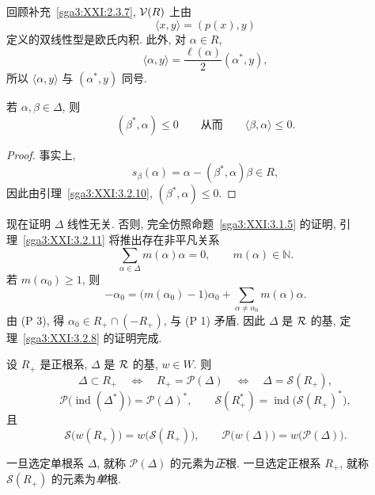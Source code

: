 回顾补充~\ref{sga3:XXI:2.3.7}, \(\mathcal{V}(R)\) 上由
\[
 \langle x,y\rangle=(p(x),y)
\]
定义的双线性型是欧氏内积. 此外, 对 \(\alpha\in R\),
\[
 \langle\alpha,y\rangle
 =\frac{\ell(\alpha)}{2}(\alpha^\ast,y),
\]
所以 \(\langle\alpha,y\rangle\) 与 \((\alpha^\ast,y)\) 同号.

\begin{lemma}\label{sga3:XXI:3.2.11}
若 \(\alpha,\beta\in\Delta\), 则
\[
 (\beta^\ast,\alpha)\leq0
 \qquad\text{从而}\qquad
 \langle\beta,\alpha\rangle\leq0.
\]
\end{lemma}
\begin{proof}
事实上,
\[
 s_\beta(\alpha)
 =\alpha-(\beta^\ast,\alpha)\beta\in R,
\]
因此由引理~\ref{sga3:XXI:3.2.10}, \((\beta^\ast,\alpha)\leq0\).
\end{proof}

现在证明 \(\Delta\) 线性无关. 否则, 完全仿照命题~\ref{sga3:XXI:3.1.5} 的证明, 引理~\ref{sga3:XXI:3.2.11} 将推出存在非平凡关系
\[
 \sum_{\alpha\in\Delta}m(\alpha)\alpha=0,
 \qquad m(\alpha)\in\mathbb N.
\]
若 \(m(\alpha_0)\geq1\), 则
\[
 -\alpha_0
 =\bigl(m(\alpha_0)-1\bigr)\alpha_0
  +\sum_{\alpha\neq\alpha_0}m(\alpha)\alpha.
\]
由 (P 3), 得 \(\alpha_0\in R_+\cap(-R_+)\), 与 (P 1) 矛盾. 因此 \(\Delta\) 是 \(\mathcal{R}\) 的基, 定理~\ref{sga3:XXI:3.2.8} 的证明完成.

\begin{corollary}\label{sga3:XXI:3.2.12}
设 \(R_+\) 是正根系, \(\Delta\) 是 \(\mathcal{R}\) 的基, \(w\in W\). 则
\[
 \Delta\subset R_+
 \quad\Longleftrightarrow\quad
 R_+=\mathscr{P}(\Delta)
 \quad\Longleftrightarrow\quad
 \Delta=\mathscr{S}(R_+),
\]
\[
 \mathscr{P}\bigl(\operatorname{ind}(\Delta^\ast)\bigr)
   =\mathscr{P}(\Delta)^\ast,
 \qquad
 \mathscr{S}(R^\ast_+)
   =\operatorname{ind}\bigl(\mathscr{S}(R_+)^\ast\bigr),
\]
且
\[
 \mathscr{S}\bigl(w(R_+)\bigr)=w\bigl(\mathscr{S}(R_+)\bigr),
 \qquad
 \mathscr{P}\bigl(w(\Delta)\bigr)=w\bigl(\mathscr{P}(\Delta)\bigr).
\]
\end{corollary}

\begin{definition}\label{sga3:XXI:3.2.13}
一旦选定单根系 \(\Delta\), 就称 \(\mathscr{P}(\Delta)\) 的元素为\emph{正}根. 一旦选定正根系 \(R_+\), 就称 \(\mathscr{S}(R_+)\) 的元素为\emph{单}根.
\end{definition}

